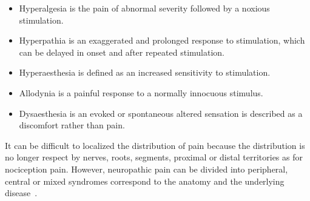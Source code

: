 \begin{itemize}
	\item Hyperalgesia is the pain of abnormal severity followed by a noxious stimulation.
	\item Hyperpathia is an exaggerated and prolonged response to stimulation, which can be delayed in onset and after repeated stimulation. 
	\item Hyperaesthesia is defined as an increased sensitivity to stimulation. 
	\item Allodynia is a painful response to a normally innocuous stimulus. 
	\item Dysaesthesia is an evoked or spontaneous altered sensation is described as a discomfort rather than pain. 
\end{itemize}


It can be difficult to localized the distribution of pain because the distribution is no longer respect by nerves, roots, segments, proximal or distal territories as for nociception pain. However, neuropathic pain can be divided into peripheral, central or mixed syndromes correspond to the anatomy and the underlying disease~\cite{Mindruta2013}. 